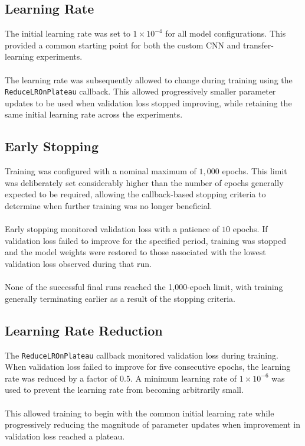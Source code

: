 \documentclass[12pt, a4paper]{report}
\let\oldsubsection\subsection
\renewcommand{\subsection}{%
    \Needspace{6\baselineskip}%
    \oldsubsection
}
\begin{document}
			\subsection{Learning Rate}
				
				The initial learning rate was set to $1 \times 10^{-4}$ for all model configurations. This provided a common starting point for both the custom CNN and transfer-learning experiments.\\\\
				The learning rate was subsequently allowed to change during training using the \texttt{ReduceLROnPlateau} callback. This allowed progressively smaller parameter updates to be used when validation loss stopped improving, while retaining the same initial learning rate across the experiments.
				
			\subsection{Early Stopping}
				
				Training was configured with a nominal maximum of $1,000$ epochs. This limit was deliberately set considerably higher than the number of epochs generally expected to be required, allowing the callback-based stopping criteria to determine when further training was no longer beneficial.\\\\
				Early stopping monitored validation loss with a patience of $10$ epochs. If validation loss failed to improve for the specified period, training was stopped and the model weights were restored to those associated with the lowest validation loss observed during that run.\\\\
				None of the successful final runs reached the 1,000-epoch limit, with training generally terminating earlier as a result of the stopping criteria.
				
			\subsection{Learning Rate Reduction}
				
				The \texttt{ReduceLROnPlateau} callback monitored validation loss during training. When validation loss failed to improve for five consecutive epochs, the learning rate was reduced by a factor of $0.5$. A minimum learning rate of $1 \times 10^{-6}$ was used to prevent the learning rate from becoming arbitrarily small.\\\\
				This allowed training to begin with the common initial learning rate while progressively reducing the magnitude of parameter updates when improvement in validation loss reached a plateau.
				
\end{document}
